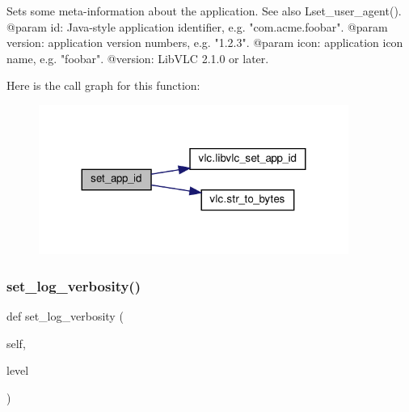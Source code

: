 \begin{DoxyVerb}Sets some meta-information about the application.
See also L{set_user_agent}().
@param id: Java-style application identifier, e.g. "com.acme.foobar".
@param version: application version numbers, e.g. "1.2.3".
@param icon: application icon name, e.g. "foobar".
@version: LibVLC 2.1.0 or later.
\end{DoxyVerb}
 Here is the call graph for this function\+:
\nopagebreak
\begin{figure}[H]
\begin{center}
\leavevmode
\includegraphics[width=287pt]{classvlc_1_1_instance_adfcc438909535cf3bc6e8c0de2009db3_cgraph}
\end{center}
\end{figure}
\mbox{\label{classvlc_1_1_instance_a037c3684941fe221e207bdc55d10c44d}} 
\subsubsection{\texorpdfstring{set\+\_\+log\+\_\+verbosity()}{set\_log\_verbosity()}}
{\footnotesize\ttfamily def set\+\_\+log\+\_\+verbosity (\begin{DoxyParamCaption}\item[{}]{self,  }\item[{}]{level }\end{DoxyParamCaption})}

